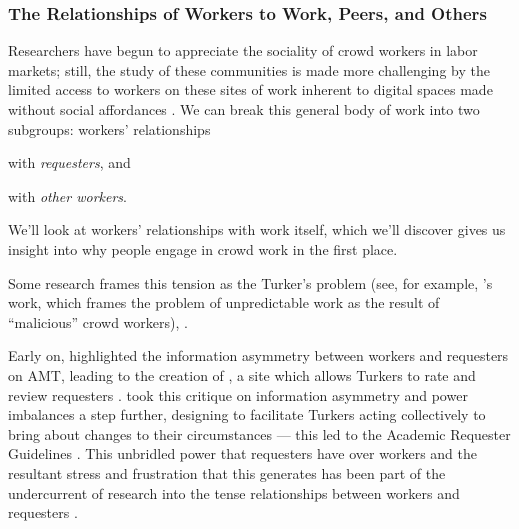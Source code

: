 \documentclass[trackingWork]{subfiles}
\begin{document}
\subsubsection[What will work and the place of work look like for workers]{The Relationships of Workers to Work, Peers, and Others}
\label{sec:relationships}

\subsubsubsection{\crowdworkpers}
Researchers have begun to appreciate
the sociality of crowd workers in labor markets;
still, the study of these communities is made more challenging by
the limited access to workers on these sites of work
inherent to digital spaces made without social affordances
\cite{crowdcollab,miller2011understanding}.
We can break this general body of work into two subgroups:
workers' relationships
\begin{inlinelist}
\item with \textit{requesters}, and
\item with \textit{other workers}.
\end{inlinelist}
We'll look at workers' relationships with work itself, which we'll discover
gives us insight into why people engage in crowd work in the first place.

Some research frames this tension as the Turker's problem
(see, for example, \citeauthor{MaliciousCrowdworkersGadiraju}'s work,
which frames the problem of unpredictable work as the result of ``malicious'' crowd workers),
\cite{MaliciousCrowdworkersGadiraju,Sheng:2008:GLI:1401890.1401965,Ipeirotis:2010:QMA:1837885.1837906}.

Early on, \citeauthor{turkopticon} highlighted
the information asymmetry between workers and requesters on AMT,
leading to the creation of \TO, a site which allows
Turkers to rate and review requesters
\cite{turkopticon}.
\citeauthor{dynamo} took this critique on information asymmetry and power imbalances a step further,
designing \DO to facilitate
Turkers acting collectively to bring about changes to their circumstances
--- this led to the Academic Requester Guidelines
\cite{dynamo}.
This unbridled power that requesters have over workers and
the resultant stress and frustration that this generates
has been part of the undercurrent of research into
the tense relationships between workers and requesters
\cite{fixingChaos,dynamo}.
\end{document}
